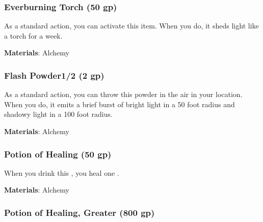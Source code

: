 \lowercase{\hypertarget{item:Everburning Torch}{}}\label{item:Everburning Torch}
\hypertarget{item:Everburning Torch}{\subsubsection{Everburning Torch\hfill{} (50 gp)}}

As a standard action, you can activate this item.
When you do, it sheds light like a torch for a week.



\vspace{0.25em}
\textbf{Materials}: Alchemy


\lowercase{\hypertarget{item:Flash Powder}{}}\label{item:Flash Powder}
\hypertarget{item:Flash Powder}{\subsubsection{Flash Powder\hfill1/2 (2 gp)}}

As a standard action, you can throw this powder in the air in your location.
When you do, it emits a brief burst of bright light in a 50 foot radius and shadowy light in a 100 foot radius.



\vspace{0.25em}
\textbf{Materials}: Alchemy


\lowercase{\hypertarget{item:Potion of Healing}{}}\label{item:Potion of Healing}
\hypertarget{item:Potion of Healing}{\subsubsection{Potion of Healing\hfill{} (50 gp)}}

When you drink this , you heal one .



\vspace{0.25em}
\textbf{Materials}: Alchemy


\lowercase{\hypertarget{item:Potion of Healing, Greater}{}}\label{item:Potion of Healing, Greater}
\hypertarget{item:Potion of Healing, Greater}{\subsubsection{Potion of Healing, Greater\hfill{} (800 gp)}}

